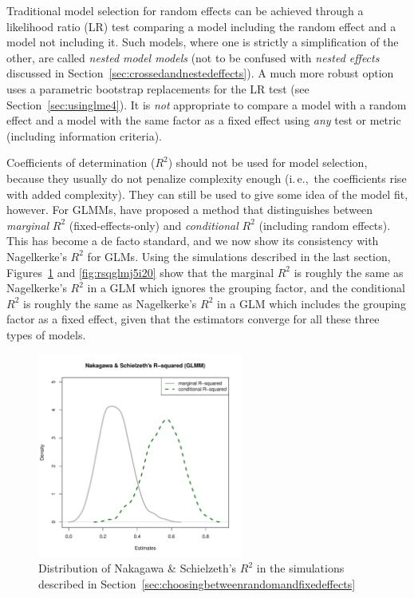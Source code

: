 \documentclass[a4paper,12pt]{article}
\newcommand{\ie}{i.\,e.,\ }
\begin{document}
Traditional model selection for random effects can be achieved through a likelihood ratio (LR) test comparing a model including the random effect and a model not including it.
Such models, where one is strictly a simplification of the other, are called \textit{nested model models} (not to be confused with \textit{nested effects} discussed in Section~\ref{sec:crossedandnestedeffects}).
A much more robust option uses a parametric bootstrap replacements for the LR test (see Section~\ref{sec:usinglme4}).
It is \textit{not} appropriate to compare a model with a random effect and a model with the same factor as a fixed effect using \textit{any} test or metric (including information criteria).

Coefficients of determination ($R^2$) should not be used for model selection, because they usually do not penalize complexity enough (\ie the coefficients rise with added complexity).
They can still be used to give some idea of the model fit, however.
For GLMMs, \citet{NakagawaSchielzeth2013} have proposed a method that distinguishes between \textit{marginal} $R^2$ (fixed-effects-only) and \textit{conditional} $R^2$ (including random effects).
This has become a de facto standard, and we now show its consistency with Nagelkerke's $R^2$ for GLMs.
Using the simulations described in the last section, Figures~\ref{fig:rsqglmmj5i20} and \ref{fig:rsqglmj5i20} show that the marginal $R^2$ is roughly the same as Nagelkerke's $R^2$ in a GLM which ignores the grouping factor, and the conditional $R^2$ is roughly the same as Nagelkerke's $R^2$ in a GLM which includes the grouping factor as a fixed effect, given that the estimators converge for all these three types of models.

\begin{figure}[!htpb]
  \centering
  \includegraphics[width=0.6\textwidth]{graphics/rsqglmmj5i20}
  \caption{Distribution of Nakagawa \& Schielzeth's $R^2$ in the simulations described in Section~\ref{sec:choosingbetweenrandomandfixedeffects}}
  \label{fig:rsqglmmj5i20}
\end{figure}
\end{document}
